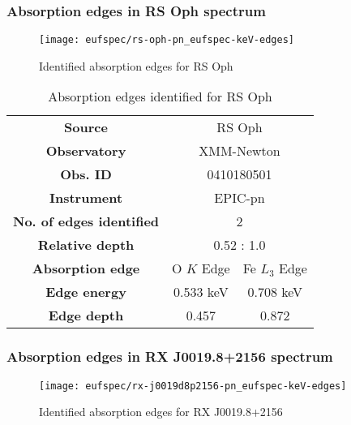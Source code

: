 			
			\newpage
			\subsubsection*{Absorption edges in RS Oph spectrum}
				\begin{figure}[h!]
					\centering
					\texttt{[image: eufspec/rs-oph-pn\_eufspec-keV-edges]}
					\caption{Identified absorption edges for RS Oph}
					\label{result:absedge-rs-oph}
				\end{figure}
				
				\renewcommand{\arraystretch}{1.5}
				\begin{table}[!htb]
					\centering
					\caption{Absorption edges identified for RS Oph}
					\label{tab:absedge-rs-oph}
					\begin{tabular}{ccc}
						\hline
						\textbf{Source} & \multicolumn{2}{c}{RS Oph} \\
						\textbf{Observatory} & \multicolumn{2}{c}{XMM-Newton} \\
						\textbf{Obs. ID} & \multicolumn{2}{c}{0410180501} \\
						\textbf{Instrument} & \multicolumn{2}{c}{EPIC-pn} \\
						\textbf{No. of edges identified} & \multicolumn{2}{c}{2} \\
						\textbf{Relative depth} & \multicolumn{2}{c}{0.52 : 1.0} \\
						\hline
						\textbf{Absorption edge} & {O $K$ Edge} & {Fe $L_3$ Edge} \\
						\textbf{Edge energy} & {0.533 keV} & {0.708 keV} \\
						\textbf{Edge depth} & {0.457} & {0.872} \\ \hline
					\end{tabular}
				\end{table}
				\renewcommand{\arraystretch}{2.2}
			
			\newpage
			\subsubsection*{Absorption edges in RX J0019.8+2156 spectrum}
				\begin{figure}[h!]
					\centering
					\texttt{[image: eufspec/rx-j0019d8p2156-pn\_eufspec-keV-edges]}
					\caption{Identified absorption edges for RX J0019.8+2156}
					\label{result:absedge-rx-j0019}
				\end{figure}
				
